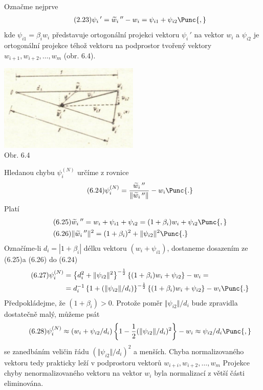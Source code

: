 Označme nejprve 
%
\begin{align*}
  \tag{2.23}
  \psi_i\,' = \widetilde w_i\,'' - w_i
  = \psi_{i1} + \psi_{i2} \Punc{,}
\end{align*}
%
kde $\psi_{i1} = \beta_i w_i$ představuje ortogonální projekci vektoru
$\psi_i\,'$ na vektor $w_i$ a $\psi_{i2}$ je ortogonální projekce
téhož vektoru na podprostor tvořený vektory
$w_{i+1},w_{i+2},\dots,w_m$ (obr. 6.4).
%
\begin{center}
\includegraphics[width=0.5\textwidth]{obr_6.4.png}\\
Obr. 6.4
\end{center}
%
Hledanou chybu $\psi_i^{(N)}$ určíme z rovnice
%
\begin{align*}
  \tag{6.24}
  \psi_i^{(N)}
    = \frac{\widetilde w_i\,''}{\Vert\widetilde w_i\,''\Vert} - w_i \Punc{.}
\end{align*}
%
Platí
%
\begin{align*}
  \tag{6.25}
  &\widetilde w_i\,'' = w_i + \psi_{i1} + \psi_{i2}
  = (1 + \beta_i)w_i + \psi_{i2} \Punc{,} \\
  \tag{6.26}
  &\Vert\widetilde w_i\,''\Vert^2 = (1 + \beta_i)^2 + \Vert\psi_{i2} \Vert^2 \Punc{.}
\end{align*}
%
Označíme-li $d_i = |1 + \beta_i|$ délku vektoru $(w_i + \psi_{i1})$,
dostaneme dosazením ze (6.25)a (6.26) do (6.24)
%
\begin{align*}
  \tag{6.27}
  \psi_i^{(N)} &=
  \left\{ d_i^2 + \Vert \psi_{i2} \Vert^2 \right\}^{-{1\over2}}
  \left\{(1 + \beta_i)w_i + \psi_{i2} \right\} - w_i = \\
  &= d_i^{-1} \left\{ 1 + (\Vert\psi_{i2}\Vert/d_i) \right\}^{-{1\over2}}
  \left\{(1+\beta_i)w_i + \psi_{i2} \right\} - w_i \Punc{.}
\end{align*}
%
Předpokládejme, že $(1+\beta_i) > 0$. Protože poměr $\Vert \psi_{i2}
\Vert/d_i$ bude zpravidla dostatečně malý, můžeme psát
%
\begin{align*}
  \tag{6.28}
  \psi_i^{(N)}\approx
  (w_i + \psi_{i2}/d_i)
  \left\{1 - {1\over2}(\Vert\psi_{i2}\Vert/d_i)^2\right\} - w_i
  \approx \psi_{i2}/d_i \Punc{,}
\end{align*}
%
se  zanedbáním veličin řádu $(\Vert\psi_{i2}\Vert/d_i)^2$ a
menších. Chyba normalizovaného vektoru tedy prakticky leží v
podprostoru vektorů $w_{i+i},w_{i+2},\dots,w_m$ Projekce chyby
nenormalizovaného vektoru na vektor $w_i$ byla normalizací z větší
části eliminována.

